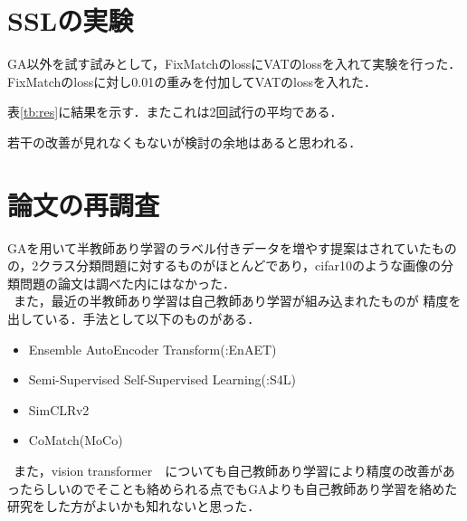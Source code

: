 \documentclass[twocolumn]{jarticle}     %
\begin{document}
\section{SSLの実験}
GA以外を試す試みとして，FixMatchのlossにVATのlossを入れて実験を行った．
FixMatchのlossに対し0.01の重みを付加してVATのlossを入れた．
\begin{table}[h]
	\centering
	\caption{実験設定\label{tb:FTXpara}}
\end{table}

表\ref{tb:res}に結果を示す．またこれは2回試行の平均である．
\begin{table}[h]
	\centering
	\caption{結果\label{tb:res}}
\end{table}
若干の改善が見れなくもないが検討の余地はあると思われる．

\section{論文の再調査}
GAを用いて半教師あり学習のラベル付きデータを増やす提案はされていたものの，2クラス分類問題に対するものがほとんどであり，cifar10のような画像の分類問題の論文は調べた内にはなかった．\\
\ また，最近の半教師あり学習は自己教師あり学習が組み込まれたものが
精度を出している．手法として以下のものがある．\\
\begin{itemize}
	\item Ensemble AutoEncoder Transform(:EnAET)
	\item Semi-Supervised Self-Supervised Learning(:S4L)
	\item SimCLRv2
	\item CoMatch(MoCo)
\end{itemize}
\ また，vision transformer　についても自己教師あり学習により精度の改善があったらしいのでそことも絡められる点でもGAよりも自己教師あり学習を絡めた研究をした方がよいかも知れないと思った．
\end{document}
